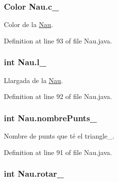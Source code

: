 \hypertarget{class_nau_a5447088ba94469c8f4285650b25211fa}{}
\subsubsection[{c\+\_\+}]{\setlength{\rightskip}{0pt plus 5cm}Color Nau.\+c\+\_\+\hspace{0.3cm}{\ttfamily [private]}}\label{class_nau_a5447088ba94469c8f4285650b25211fa}


Color de la \hyperlink{class_nau}{Nau}. 



Definition at line 93 of file Nau.\+java.

\hypertarget{class_nau_a67c5417119c7e520e1876a919119867d}{}
\subsubsection[{l\+\_\+}]{\setlength{\rightskip}{0pt plus 5cm}int Nau.\+l\+\_\+\hspace{0.3cm}{\ttfamily [protected]}}\label{class_nau_a67c5417119c7e520e1876a919119867d}


Llargada de la \hyperlink{class_nau}{Nau}. 



Definition at line 92 of file Nau.\+java.

\hypertarget{class_nau_adaf4948df660e9cfcac14a3fb75de454}{}
\subsubsection[{nombre\+Punts\+\_\+}]{\setlength{\rightskip}{0pt plus 5cm}int Nau.\+nombre\+Punts\+\_\+\hspace{0.3cm}{\ttfamily [private]}}\label{class_nau_adaf4948df660e9cfcac14a3fb75de454}


Nombre de punts que té el triangle\+\_\+. 



Definition at line 91 of file Nau.\+java.

\hypertarget{class_nau_a128a1860c49ef16bfd63406f4ef0db75}{}
\subsubsection[{rotar\+\_\+}]{\setlength{\rightskip}{0pt plus 5cm}int Nau.\+rotar\+\_\+\hspace{0.3cm}{\ttfamily [private]}}\label{class_nau_a128a1860c49ef16bfd63406f4ef0db75}


